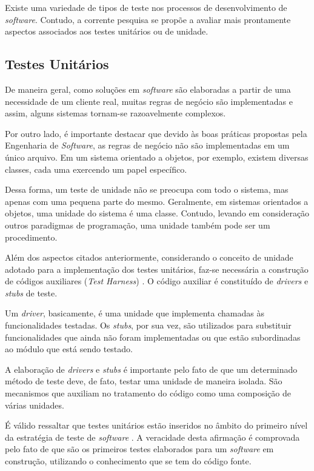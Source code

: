 Existe uma variedade de tipos de teste nos processos de desenvolvimento de \textit{software}. Contudo, a corrente pesquisa se propõe a avaliar mais prontamente aspectos associados aos testes unitários ou de unidade.

\subsection{Testes Unitários}

De maneira geral, como soluções em \textit{software} são elaboradas a partir de uma necessidade de um cliente real, muitas regras de negócio são implementadas e assim, alguns sistemas tornam-se razoavelmente complexos.

Por outro lado, é importante destacar que devido às boas práticas propostas pela Engenharia de \textit{Software}, as regras de negócio não são implementadas em um único arquivo. Em um sistema orientado a objetos, por exemplo, existem diversas classes, cada uma exercendo um papel específico.

Dessa forma, um teste de unidade não se preocupa com todo o sistema, mas apenas com uma pequena parte do mesmo. Geralmente, em sistemas orientados a objetos, uma unidade do sistema é uma classe. Contudo, levando em consideração outros paradigmas de programação, uma unidade também pode ser um procedimento.

Além dos aspectos citados anteriormente, considerando o conceito de unidade adotado para a implementação dos testes unitários, faz-se necessária a construção de códigos auxiliares (\textit{Test Harness}) \cite{stubs1}. O código auxiliar é constituído de \textit{drivers} e \textit{stubs} de teste.

Um \textit{driver}, basicamente, é uma unidade que implementa chamadas às funcionalidades testadas. Os \textit{stubs}, por sua vez, são utilizados para substituir funcionalidades que ainda não foram implementadas ou que estão subordinadas ao módulo que está sendo testado.

A elaboração de \textit{drivers} e \textit{stubs} é importante pelo fato de que um determinado método de teste deve, de fato, testar uma unidade de maneira isolada. São mecanismos que auxiliam no tratamento do código como uma composição de várias unidades.

É válido ressaltar que testes unitários estão inseridos no âmbito do primeiro nível da estratégia de teste de \textit{software} \cite{nasa}. A veracidade desta afirmação é comprovada pelo fato de que são os primeiros testes elaborados para um \textit{software} em construção, utilizando o conhecimento que se tem do código fonte.

